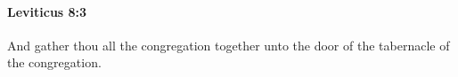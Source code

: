 
		\paragraph{Leviticus 8:3} %
			\label{LEVITICUS-8-3}

			And gather thou all the congregation together unto the door of the tabernacle of the congregation.


